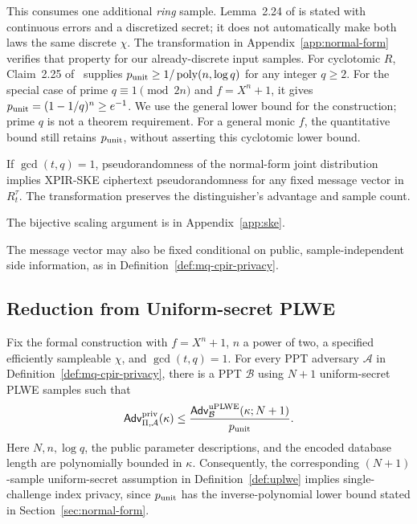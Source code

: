 This consumes one additional \emph{ring} sample. Lemma~2.24 of
\cite{lpr2013toolkit} is stated with continuous errors and a discretized
secret; it does not automatically make both laws the same discrete
\(\chi\). The transformation in Appendix~\ref{app:normal-form} verifies that property for our
already-discrete input samples.
For cyclotomic \(R\), Claim~2.25 of~\cite{lpr2013toolkit} supplies
\(p_{\rm unit}\ge 1/\operatorname{poly}(n,\log q)\) for any integer
\(q\ge2\). For the special case of prime \(q\equiv1\pmod{2n}\) and
\(f=X^n+1\), it gives \(p_{\rm unit}=(1-1/q)^n\ge e^{-1}\).
We use the general lower bound for the construction; prime \(q\) is not
a theorem requirement. For a general monic \(f\), the quantitative bound
still retains \(p_{\rm unit}\), without asserting this cyclotomic lower bound.

\begin{corollary}
\label{cor:ske-pseudorandom}
If \(\gcd(t,q)=1\), pseudorandomness of the normal-form joint distribution
implies XPIR-SKE ciphertext pseudorandomness for any fixed message vector
in \(R_t^\tau\).
The transformation preserves the distinguisher's advantage and sample count.
\end{corollary}
The bijective scaling argument is in Appendix~\ref{app:ske}.

The message vector may also be fixed conditional on public, sample-independent
side information, as in Definition~\ref{def:mq-cpir-privacy}.

\subsection{Reduction from Uniform-secret PLWE}
\begin{theorem}
\label{thm:mq-privacy}
Fix the formal construction with \(f=X^n+1\), \(n\) a power of two,
a specified efficiently sampleable \(\chi\), and \(\gcd(t,q)=1\).
For every PPT adversary \(\mathcal A\) in
Definition~\ref{def:mq-cpir-privacy}, there is a PPT \(\mathcal B\)
using \(N+1\) uniform-secret PLWE samples such that
\[
 \mathsf{Adv}^{\rm priv}_{\Pi,\mathcal A}(\kappa)
   \le \frac{\mathsf{Adv}^{\rm uPLWE}_{\mathcal B}(\kappa;N+1)}
                  {p_{\rm unit}}.
\]
Here \(N,n,\log q\), the public parameter descriptions, and the encoded
database length are polynomially bounded in \(\kappa\).
Consequently, the corresponding \((N+1)\)-sample uniform-secret
assumption in Definition~\ref{def:uplwe} implies single-challenge index
privacy, since \(p_{\rm unit}\) has the inverse-polynomial lower bound
stated in Section~\ref{sec:normal-form}.
\end{theorem}

